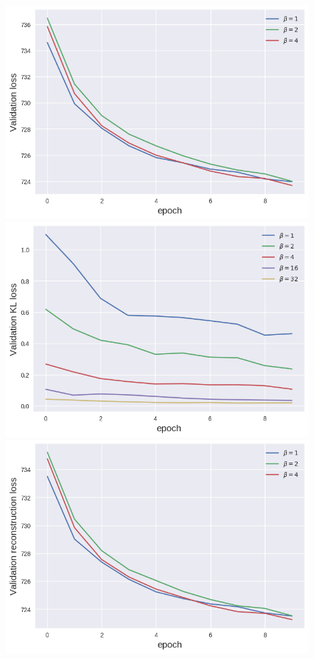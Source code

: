 \begin{figure}[h!]
\centering
\captionsetup{justification=centering}
    \includegraphics[scale=0.5]{figures/results/naive_average/val_loss.png}
    \includegraphics[scale=0.5]{figures/results/naive_average/val_kl_loss.png}
    \includegraphics[scale=0.5]{figures/results/naive_average/val_reconstruction_loss.png}

\end{figure}
